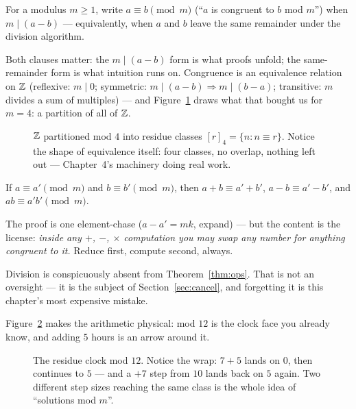 \begin{definition}
For a modulus $m \ge 1$, write $a \equiv b \pmod m$ (``$a$ is congruent to
$b$ mod $m$'') when $m \mid (a - b)$ --- equivalently, when $a$ and $b$
leave the same remainder under the division algorithm.
\end{definition}

Both clauses matter: the $m \mid (a-b)$ form is what proofs unfold; the
same-remainder form is what intuition runs on. Congruence is an equivalence
relation on $\mathbb{Z}$ (reflexive: $m \mid 0$; symmetric: $m \mid (a-b)
\Rightarrow m \mid (b-a)$; transitive: $m$ divides a sum of multiples) ---
and Figure~\ref{fig:classes} draws what that bought us for $m = 4$: a
partition of all of $\mathbb{Z}$.

\begin{figure}[ht]\centering

\caption{$\mathbb{Z}$ partitioned mod $4$ into residue classes
$[r]_4 = \{n : n \equiv r\}$. Notice the shape of equivalence itself: four
classes, no overlap, nothing left out --- Chapter~4's machinery doing real
work.}
\label{fig:classes}
\end{figure}

\begin{theorem}\label{thm:ops}
If $a \equiv a' \pmod m$ and $b \equiv b' \pmod m$, then
$a + b \equiv a' + b'$, $a - b \equiv a' - b'$, and $ab \equiv a'b'
\pmod m$.
\end{theorem}

The proof is one element-chase ($a - a' = mk$, expand) --- but the content
is the license: \emph{inside any $+$, $-$, $\times$ computation you may swap
any number for anything congruent to it.} Reduce first, compute second,
always.

\begin{remark}
Division is conspicuously absent from Theorem~\ref{thm:ops}. That is not an
oversight --- it is the subject of Section~\ref{sec:cancel}, and forgetting
it is this chapter's most expensive mistake.
\end{remark}

Figure~\ref{fig:clock} makes the arithmetic physical: mod $12$ is the clock
face you already know, and adding $5$ hours is an arrow around it.

\begin{figure}[ht]\centering

\caption{The residue clock mod $12$. Notice the wrap: $7 + 5$ lands on $0$,
then continues to $5$ --- and a $+7$ step from $10$ lands back on $5$ again.
Two different step sizes reaching the same class is the whole idea of
``solutions mod $m$''.}
\label{fig:clock}
\end{figure}

